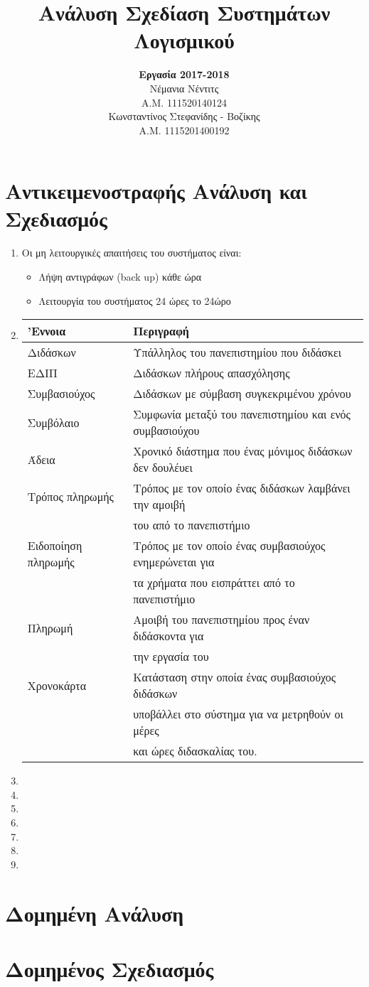 \documentclass[12pt]{article}
\title{Ανάλυση Σχεδίαση Συστημάτων Λογισμικού}
\author{\textbf{Εργασία 2017-2018} \\Νέμανια Νέντιτς \\ Α.Μ. 111520140124 \\ Κωνσταντίνος Στεφανίδης - Βοζίκης \\ Α.Μ. 1115201400192}
\date{}
\begin{document}
\maketitle
\section*{Αντικειμενοστραφής Ανάλυση και Σχεδιασμός}
\begin{enumerate}
\item
Οι μη λειτουργικές απαιτήσεις του συστήματος είναι:
\begin{itemize}
\item
Λήψη αντιγράφων (\textlatin{back up}) κάθε ώρα
\item
Λειτουργία του συστήματος 24 ώρες το 24ώρο
\end{itemize}
\item
\begin{tabular}{|l|l|}
\hline
'Εννοια & Περιγραφή \\
\hline
Διδάσκων & Υπάλληλος του πανεπιστημίου που διδάσκει \\
\hline
ΕΔΙΠ & Διδάσκων πλήρους απασχόλησης \\
\hline
Συμβασιούχος & Διδάσκων με σύμβαση συγκεκριμένου χρόνου \\
\hline
Συμβόλαιο & Συμφωνία μεταξύ του πανεπιστημίου και ενός συμβασιούχου \\
\hline
Άδεια & Χρονικό διάστημα που ένας μόνιμος διδάσκων δεν δουλέυει \\ 
\hline
Τρόπος πληρωμής & Τρόπος με τον οποίο ένας διδάσκων λαμβάνει την αμοιβή \\ 
& του από το πανεπιστήμιο \\
\hline
Ειδοποίηση πληρωμής & Τρόπος με τον οποίο ένας συμβασιούχος ενημερώνεται για \\
 & τα χρήματα που εισπράττει από το πανεπιστήμιο \\
\hline
Πληρωμή & Αμοιβή του πανεπιστημίου προς έναν διδάσκοντα για \\ 
& την εργασία του \\ 
\hline
Χρονοκάρτα & Κατάσταση στην οποία ένας συμβασιούχος διδάσκων \\
 & υποβάλλει στο σύστημα για να μετρηθούν οι μέρες \\
 &  και ώρες διδασκαλίας του. \\
\hline
\end{tabular}

\item

\item

\item

\item

\item

\item

\item
\end{enumerate}


\section*{Δομημένη Ανάλυση}

\section*{Δομημένος Σχεδιασμός}
\end{document}
